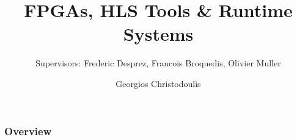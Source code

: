 \documentclass{beamer}
\title[George Christodoulis]{FPGAs, HLS Tools \& Runtime Systems} %
\subtitle{{\fontsize{8}{6}\selectfont Supervisors: Frederic Desprez, Francois Broquedis, Olivier Muller}}
\author{Georgios Christodoulis} %
\institute[NTUA] %
{
CORSE$-$LIG\\ %
\medskip
\textit{gchristodoulis@gmail.com} %
}
\date{}
\begin{document}
\begin{frame}
\titlepage %
\end{frame}

\begin{frame}
\frametitle{Overview} %
\tableofcontents %
\end{frame}
\end{document}
